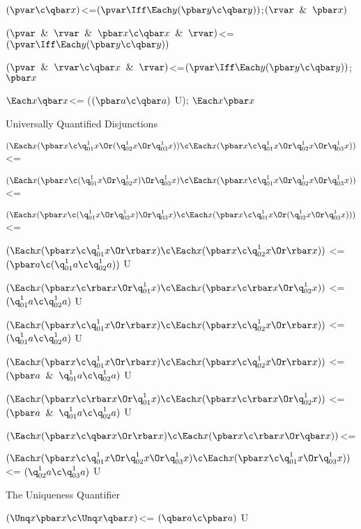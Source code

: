 $(\pvar \c\qbar x )$<=$(\pvar \Iff \Each y(\pbar y \c \qbar y))$;$(\rvar \And \pbar x)$

$(\pvar \And \rvar \And \pbar x\c\qbar x \And \rvar)$<=$(\pvar \Iff \Each y(\pbar y \c \qbar y))$

$(\pvar \And \rvar \c \qbar x \And \rvar)$<=$(\pvar \Iff \Each y(\pbar y \c \qbar y))$;$\pbar x$

$\Each x \qbar x$<= ($(\pbar a \c \qbar a)$ U); $\Each x\pbar x$
\lineb

Universally Quantified Disjunctions

$(\Each x (\pbar x \c \q^{1}_{01}x \Or (\q^{1}_{02}x \Or \q^{1}_{03}x))\c \Each x (\pbar x \c \q^{1}_{01}x \Or \q^{1}_{02}x \Or \q^{1}_{03}x))$ <=

$(\Each x (\pbar x \c (\q^{1}_{01}x \Or \q^{1}_{02}x) \Or \q^{1}_{03}x)\c \Each x (\pbar x \c \q^{1}_{01}x \Or \q^{1}_{02}x \Or \q^{1}_{03}x))$ <=

$(\Each x (\pbar x \c (\q^{1}_{01}x \Or \q^{1}_{02}x) \Or \q^{1}_{03}x)\c \Each x (\pbar x \c \q^{1}_{01}x \Or (\q^{1}_{02}x \Or \q^{1}_{03}x)))$ <=

$(\Each x (\pbar x \c \q^{1}_{01}x \Or \rbar x)\c \Each x (\pbar x \c \q^{1}_{02}x \Or \rbar x))$ <= $(\pbar a \c (\q^{1}_{01}a \c \q^{1}_{02}a))$ U

$(\Each x (\pbar x \c \rbar x \Or \q^{1}_{01}x )\c \Each x (\pbar x \c \rbar x \Or \q^{1}_{02}x))$ <= $(\q^{1}_{01}a \c \q^{1}_{02}a)$ U

$(\Each x (\pbar x \c  \q^{1}_{01}x \Or \rbar x)\c \Each x (\pbar x \c \q^{1}_{02}x \Or \rbar x))$ <= $(\q^{1}_{01}a \c \q^{1}_{02}a)$ U

$(\Each x (\pbar x \c \q^{1}_{01}x \Or \rbar x)\c \Each x (\pbar x \c \q^{1}_{02}x \Or \rbar x))$ <= $(\pbar a \And \q^{1}_{01}a \c \q^{1}_{02}a)$ U

$(\Each x (\pbar x \c \rbar x\Or \q^{1}_{01}x )\c \Each x (\pbar x \c \rbar x \Or \q^{1}_{02}x ))$ <= $(\pbar a \And \q^{1}_{01}a \c \q^{1}_{02}a)$ U

$(\Each x(\pbar x \c \qbar x \Or \rbar x) \c \Each x (\pbar x \c \rbar x \Or \qbar x))$<=

$(\Each x (\pbar x \c \q^{1}_{01} x \Or \q^{1}_{02} x \Or \q^{1}_{03} x) \c\Each x (\pbar x \c \q^{1}_{01} x  \Or \q^{1}_{03} x ))$<= $(\q^{1}_{02} a\c \q^{1}_{03} a)$ U
\lineb

The  Uniqueness Quantifier
\lineb

$(\Unq x \pbar x \c \Unq x \qbar x)$<= $(\qbar a \c \pbar a)$ U


